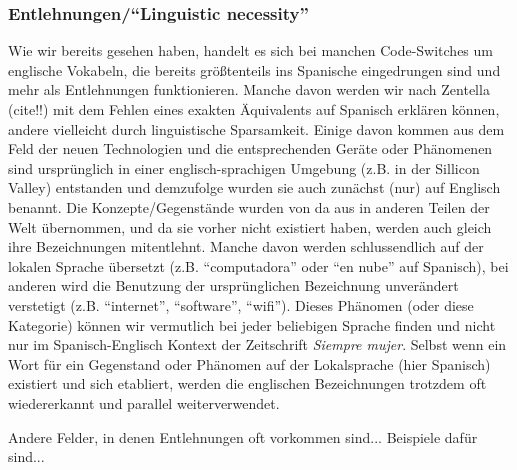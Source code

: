 \subsubsection{Entlehnungen/``Linguistic necessity''}
Wie wir bereits gesehen haben, handelt es sich bei manchen Code-Switches um englische Vokabeln, die bereits größtenteils ins Spanische eingedrungen sind und mehr als Entlehnungen funktionieren.
Manche davon werden wir nach Zentella (cite!!) mit dem Fehlen eines exakten Äquivalents auf Spanisch erklären können, andere vielleicht durch linguistische Sparsamkeit. %
Einige davon kommen aus dem Feld der neuen Technologien und die entsprechenden Geräte oder Phänomenen sind ursprünglich in einer englisch-sprachigen Umgebung (z.B. in der Sillicon Valley) entstanden und demzufolge wurden sie auch zunächst (nur) auf Englisch benannt.
Die Konzepte/Gegenstände wurden von da aus in anderen Teilen der Welt übernommen, und da sie vorher nicht existiert haben, werden auch gleich ihre Bezeichnungen mitentlehnt.
Manche davon werden schlussendlich auf der lokalen Sprache übersetzt (z.B. ``computadora'' oder ``en nube'' auf Spanisch), bei anderen wird die Benutzung der ursprünglichen Bezeichnung unverändert verstetigt (z.B. ``internet'', ``software'', ``wifi'').
Dieses Phänomen (oder diese Kategorie) können wir vermutlich bei jeder beliebigen Sprache finden und nicht nur im Spanisch-Englisch Kontext der Zeitschrift \textit{Siempre mujer}.
Selbst wenn ein Wort für ein Gegenstand oder Phänomen auf der Lokalsprache (hier Spanisch) existiert und sich etabliert, werden die englischen Bezeichnungen trotzdem oft wiedererkannt und parallel weiterverwendet.

Andere Felder, in denen Entlehnungen oft vorkommen sind...
Beispiele dafür sind...

